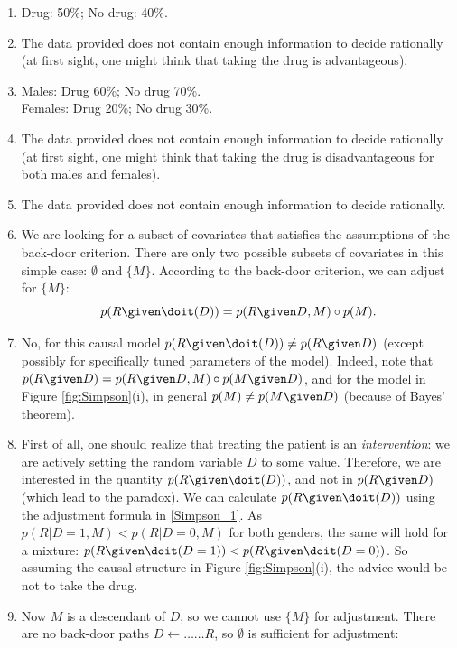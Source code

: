 \begin{enumerate}
  \begin{ungradedsolution}
    \begin{enumerate}
      \item Drug: 50\%; No drug: 40\%.
      \item The data provided does not contain enough information to decide rationally (at first sight, one might think that taking the drug is advantageous).
      \item Males: Drug 60\%; No drug 70\%.\\
      Females: Drug 20\%; No drug 30\%.
      \item  The data provided does not contain enough information to decide rationally (at first sight, one might think that taking the drug is disadvantageous for both males and females).
      \item The data provided does not contain enough information to decide rationally.
      \item We are looking for a subset of covariates that satisfies the assumptions of the back-door criterion. There are only two possible
      subsets of covariates in this simple case: $\emptyset$ and $\{M\}$. According to the back-door criterion, we can adjust for $\{M\}$:
      $$p(R \given \doit(D)) = p(R \given D, M) \circ p(M).$$
      \item No, for this causal model $p(R \given \doit(D)) \ne p(R \given D)$ (except possibly for specifically tuned parameters of the model). Indeed,
      note that $p(R \given D) = p(R \given D, M) \circ p(M \given D)$, and for the model in Figure \ref{fig:Simpson}(i), in general $p(M) \ne p(M \given D)$ (because of Bayes' theorem).
      \item First of all, one should realize that treating the patient is an \emph{intervention}: we are actively setting the random variable $D$ to some value.
      Therefore, we are interested in the quantity $p(R \given \doit(D))$, and not in $p(R \given D)$ (which lead to the paradox). We can calculate
      $p(R \given \doit(D))$ using the adjustment formula in \ref{Simpson_1}. As $p(R|D=1,M) < p(R|D=0,M)$ for both genders, the same will hold for a mixture:
      $p(R \given \doit(D=1)) < p(R \given \doit(D=0))$. So assuming
      the causal structure in Figure \ref{fig:Simpson}(i), the advice would be not to take the drug.
      \item Now $M$ is a descendant of $D$, so we cannot use $\{M\}$ for adjustment. There are no back-door paths $D \leftarrow \dots \dots R$, so
      $\emptyset$ is sufficient for adjustment:

\end{enumerate}
\end{ungradedsolution}
\end{enumerate}
